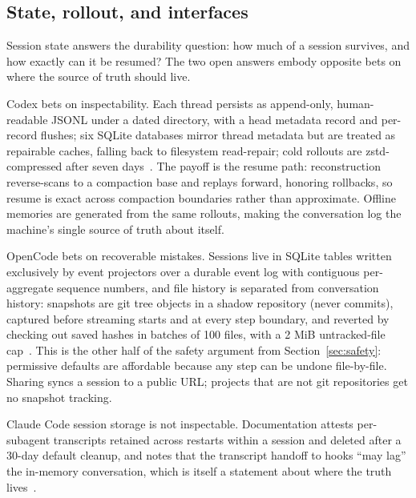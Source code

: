\documentclass{article}
\newcommand{\codex}[0]{Codex}
\newcommand{\occ}[0]{OpenCode}
\newcommand{\ccc}[0]{Claude Code}
\begin{document}
\subsection{State, rollout, and interfaces}
\label{sec:state}

Session state answers the durability question: how much of a session
survives, and how exactly can it be resumed? The two open answers embody
opposite bets on where the source of truth should live.

\codex{} bets on inspectability. Each thread persists as append-only,
human-readable JSONL under a dated directory, with a head metadata record
and per-record flushes; six SQLite databases mirror thread metadata but
are treated as repairable caches, falling back to filesystem read-repair;
cold rollouts are zstd-compressed after seven days~\citep{codexRepo}. The
payoff is the resume path: reconstruction reverse-scans to a compaction
base and replays forward, honoring rollbacks, so resume is exact across
compaction boundaries rather than approximate. Offline memories are
generated from the same rollouts, making the conversation log the
machine's single source of truth about itself.

\occ{} bets on recoverable mistakes. Sessions live in SQLite tables
written exclusively by event projectors over a durable event log with
contiguous per-aggregate sequence numbers, and file history is separated
from conversation history: snapshots are git tree objects in a shadow
repository (never commits), captured before streaming starts and at every
step boundary, and reverted by checking out saved hashes in batches of
100 files, with a 2 MiB untracked-file cap~\citep{opencodeRepo}. This is
the other half of the safety argument from
Section~\ref{sec:safety}: permissive defaults are affordable because any
step can be undone file-by-file. Sharing syncs a session to a public URL;
projects that are not git repositories get no snapshot tracking.

\ccc{} session storage is not inspectable. Documentation attests
per-subagent transcripts retained across restarts within a session and
deleted after a 30-day default cleanup, and notes that the transcript
handoff to hooks ``may lag'' the in-memory conversation, which is itself
a statement about where the truth
lives~\citep{claudeCodeDocsSubagents,claudeCodeDocsHooks}.
\end{document}
